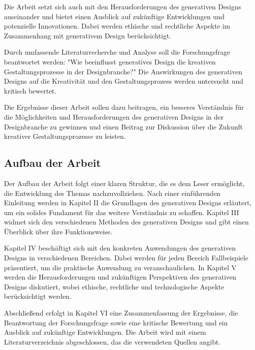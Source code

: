 Die Arbeit setzt sich auch mit den Herausforderungen des generativen Designs auseinander und bietet einen Ausblick auf zukünftige Entwicklungen und potenzielle Innovationen. Dabei werden ethische und rechtliche Aspekte im Zusammenhang mit generativem Design berücksichtigt.

Durch umfassende Literaturrecherche und Analyse soll die Forschungsfrage beantwortet werden: "Wie beeinflusst generatives Design die kreativen Gestaltungsprozesse in der Designbranche?" Die Auswirkungen des generativen Designs auf die Kreativität und den Gestaltungsprozess werden untersucht und kritisch bewertet.

Die Ergebnisse dieser Arbeit sollen dazu beitragen, ein besseres Verständnis für die Möglichkeiten und Herausforderungen des generativen Designs in der Designbranche zu gewinnen und einen Beitrag zur Diskussion über die Zukunft kreativer Gestaltungsprozesse zu leisten.

\subsection{Aufbau der Arbeit}

Der Aufbau der Arbeit folgt einer klaren Struktur, die es dem Leser ermöglicht, die Entwicklung des Themas nachzuvollziehen. Nach einer einführenden Einleitung werden in Kapitel II die Grundlagen des generativen Designs erläutert, um ein solides Fundament für das weitere Verständnis zu schaffen. Kapitel III widmet sich den verschiedenen Methoden des generativen Designs und gibt einen Überblick über ihre Funktionsweise.

Kapitel IV beschäftigt sich mit den konkreten Anwendungen des generativen Designs in verschiedenen Bereichen. Dabei werden für jeden Bereich Fallbeispiele präsentiert, um die praktische Anwendung zu veranschaulichen. In Kapitel V werden die Herausforderungen und zukünftigen Perspektiven des generativen Designs diskutiert, wobei ethische, rechtliche und technologische Aspekte berücksichtigt werden.

Abschließend erfolgt in Kapitel VI eine Zusammenfassung der Ergebnisse, die Beantwortung der Forschungsfrage sowie eine kritische Bewertung und ein Ausblick auf zukünftige Entwicklungen. Die Arbeit wird mit einem Literaturverzeichnis abgeschlossen, das die verwendeten Quellen angibt.